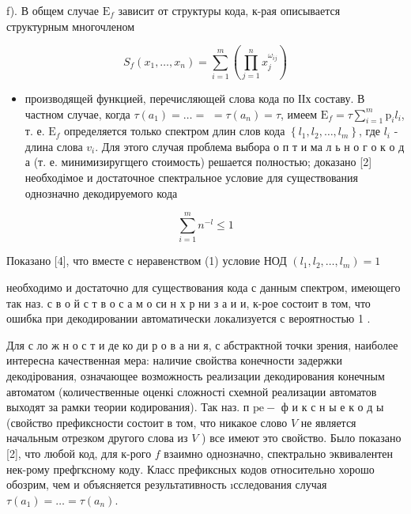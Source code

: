 \documentclass[10pt]{article}
\begin{document}
f). В общем случае $\mathrm{E}_{f}$ зависит от структуры кода, к-рая описывается структурным многочленом



\[

S_{f}\left(x_{1}, \ldots, x_{n}\right)=\sum_{i=1}^{m}\left(\prod_{j=1}^{n} x_{j}^{\omega_{i j}}\right)

\]



\begin{itemize}

  \item производящей функцией, перечисляющей слова кода по ІІх составу. В частном случае, когда $\tau\left(a_{1}\right)=\ldots=$ $=\tau\left(a_{n}\right)=\tau$, имеем $\mathrm{E}_{f}=\tau \sum_{i=1}^{m} \mathrm{p}_{i} l_{i}$, т. е. $\mathrm{E}_{f}$ определяется только спектром длин слов кода $\left\{l_{1}, l_{2}, \ldots, l_{m}\right\}$, где $l_{i}$ - длина слова $v_{i}$. Для этого случая проблема выбора о п т и ма л ь н о г о к о д а (т. е. минимизиругщего стоимость) решается полностью; доказано [2] необходімое и достаточное спектральное условие для существования однозначно декодируемого кода

\end{itemize}



\[

\sum_{i=1}^{m} n^{-l} \leqslant 1

\]



Показано [4], что вместе с неравенством (1) условие НОД $\left(l_{1}, l_{2}, \ldots, l_{m}\right)=1$



необходимо и достаточно для существования кода с данным спектром, имеющего так наз. с в о й с т в о с а м о си н х р ни з а и и, к-рое состоит в том, что ошибка при декодировании автоматически локализуется с вероятностью 1 .



Для с ло ж н о с т и де ко ди р о в а ни я, с абстрактной точки зрения, наиболее интересна качественная мера: наличие свойства конечности задержки декодірования, означающее возможность реализации декодирования конечным автоматом (количественные оценкі сложності схемной реализации автоматов выходят за рамки теории кодирования). Так наз. п $\mathrm{p} \mathrm{e}-$ ф и к с н ы е к о д ы (свойство префиксности состоит в том, что никакое слово $V$ не является начальным отрезком другого слова из $V$ ) все имеют это свойство. Было показано [2], что любой код, для к-рого $f$ взаимно однозначно, спектрально эквивалентен нек-рому префгксному коду. Класс префиксных кодов относительно хорошо обозрим, чем и объясняется результативность ıсследования случая $\tau\left(a_{1}\right)=\ldots=\tau\left(a_{n}\right)$.
\end{document}
